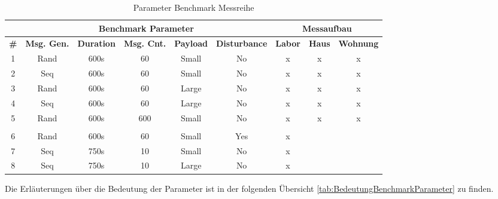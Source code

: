\begin{table}[h]
\centering
\begin{adjustbox}{width=1\textwidth}
\begin{tabular}{|c|c|c|c|c|c|c|c|c|} 
\cline{2-9}
\multicolumn{1}{c|}{} & \multicolumn{5}{c|}{Benchmark Parameter} & \multicolumn{3}{c|}{Messaufbau} \\ 
\hline
\textbf{\#}  & \textbf{Msg. Gen.}  & \textbf{Duration} & \textbf{Msg. Cnt.}  & \textbf{Payload }  & \textbf{Disturbance}  & \textbf{Labor}  & \textbf{Haus}  & \textbf{Wohnung}  \\ 
\hline
1 & Rand & 600s & 60 & Small & No & x & x & x \\ 
\hline
2 & Seq & 600s & 60 & Small & No & x & x & x \\ 
\hline
3 & Rand & 600s & 60 & Large & No & x & x & x \\ 
\hline
4 & Seq & 600s & 60 & Large & No & x & x & x \\ 
\hline
5 & Rand & 600s & 600 & Small & No & x & x & x \\ 
\hline
\multicolumn{1}{c}{} & \multicolumn{1}{c}{} & \multicolumn{1}{c}{} & \multicolumn{1}{c}{} & \multicolumn{1}{c}{} & \multicolumn{1}{c}{} & \multicolumn{1}{c}{} & \multicolumn{1}{c}{} & \multicolumn{1}{c}{} \\ 
\hline
6 & Rand & 600s & 60 & Small & Yes & x &  &  \\ 
\hline
7 & Seq & 750s & 10 & Small & No & x &  &  \\ 
\hline
8 & Seq & 750s & 10 & Large & No & x &  &  \\
\hline
\end{tabular}
\end{adjustbox}
\caption{Parameter Benchmark Messreihe}
\label{tab:ParameterBenchmarkMessreihe}
\end{table}

Die Erläuterungen über die Bedeutung der Parameter ist in der folgenden Übersicht \ref{tab:BedeutungBenchmarkParameter} zu finden. 

